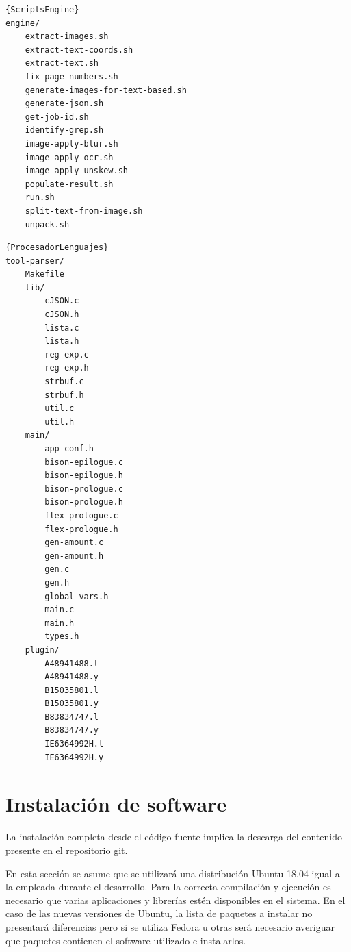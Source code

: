 \noindent\begin{minipage}{.45\textwidth}
\begin{lstlisting}[caption=Scripts del engine.,frame=tlrb]{ScriptsEngine}
engine/
    extract-images.sh
    extract-text-coords.sh
    extract-text.sh
    fix-page-numbers.sh
    generate-images-for-text-based.sh
    generate-json.sh
    get-job-id.sh
    identify-grep.sh
    image-apply-blur.sh
    image-apply-ocr.sh
    image-apply-unskew.sh
    populate-result.sh
    run.sh
    split-text-from-image.sh
    unpack.sh
\end{lstlisting}
\end{minipage}\hfill
\begin{minipage}{.45\textwidth}
\begin{lstlisting}[caption=Fuentes del procesador de lenguaje intermedio.,frame=tlrb,label=lst:fuentes-del-procesador-de-lenguajes]{ProcesadorLenguajes}
tool-parser/
    Makefile
    lib/
        cJSON.c
        cJSON.h
        lista.c
        lista.h
        reg-exp.c
        reg-exp.h
        strbuf.c
        strbuf.h
        util.c
        util.h
    main/
        app-conf.h
        bison-epilogue.c
        bison-epilogue.h
        bison-prologue.c
        bison-prologue.h
        flex-prologue.c
        flex-prologue.h
        gen-amount.c
        gen-amount.h
        gen.c
        gen.h
        global-vars.h
        main.c
        main.h
        types.h
    plugin/
        A48941488.l
        A48941488.y
        B15035801.l
        B15035801.y
        B83834747.l
        B83834747.y
        IE6364992H.l
        IE6364992H.y
\end{lstlisting}
\end{minipage}

\section{Instalación de software}
\label{sec:instalacion-software}

La instalación completa desde el código fuente implica la descarga del contenido presente en el repositorio git.

En esta sección se asume que se utilizará una distribución Ubuntu 18.04 igual a la empleada durante el desarrollo. Para la correcta compilación y ejecución es necesario que varias aplicaciones y librerías estén disponibles en el sistema. En el caso de las nuevas versiones de Ubuntu, la lista de paquetes a instalar no presentará diferencias pero si se utiliza Fedora u otras será necesario averiguar que paquetes contienen el software utilizado e instalarlos.

